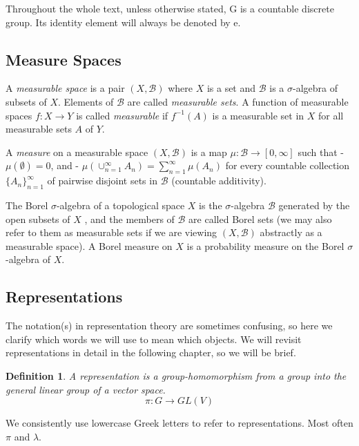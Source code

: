 \documentclass[
]{article}
\newtheorem{defn}{Definition}
\begin{document}
Throughout the whole text, unless otherwise stated, G is a countable
discrete group. Its identity element will always be denoted by e.

\hypertarget{measure-spaces}{%
\subsection{Measure Spaces}\label{measure-spaces}}

A \emph{measurable space} is a pair \((X, \mathscr{B})\) where \(X\) is
a set and \(\mathscr{B}\) is a \(\sigma\)-algebra of subsets of \(X\).
Elements of \(\mathscr{B}\) are called \emph{measurable sets}. A
function of measurable spaces \(f: X \rightarrow Y\) is called
\emph{measurable} if \(f^{-1}(A)\) is a measurable set in \(X\) for all
measurable sets \(A\) of \(Y\).

A \emph{measure} on a measurable space \((X, \mathscr{B})\) is a map
\(\mu: \mathscr{B} \rightarrow [0, \infty]\) such that -
\(\mu(\emptyset) = 0\), and -
\(\mu(\cup_{n=1}^{\infty} A_n) = \sum_{n=1}^{\infty} \mu(A_n)\) for
every countable collection \(\{A_n\}_{n=1}^{\infty}\) of pairwise
disjoint sets in \(\mathscr{B}\) (countable additivity).

The Borel \(\sigma\)-algebra of a topological space \(X\) is the
\(\sigma\)-algebra \(\mathscr{B}\) generated by the open subsets of
\(X\) , and the members of \(\mathscr{B}\) are called Borel sets (we may
also refer to them as measurable sets if we are viewing
\((X, \mathscr{B})\) abstractly as a measurable space). A Borel measure
on \(X\) is a probability measure on the Borel \(\sigma\)-algebra of
\(X\).

\hypertarget{representations}{%
\subsection{Representations}\label{representations}}

The notation(s) in representation theory are sometimes confusing, so
here we clarify which words we will use to mean which objects. We will
revisit representations in detail in the following chapter, so we will
be brief.

  
\begin{defn}
A representation is a group-homomorphism from a group into the general linear group of a vector space.
$$
\pi: G \rightarrow GL(V)
$$
\end{defn}

We consistently use lowercase Greek letters to refer to representations.
Most often \(\pi\) and \(\lambda\).
\end{document}
